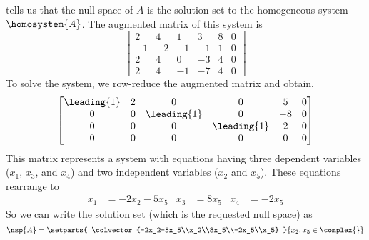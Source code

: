  tells us that the null space of $A$ is the solution set to the homogeneous system $\homosystem{A}$.  The augmented matrix of this system is
%
\begin{equation*}
\begin{bmatrix}
 2 & 4 & 1 & 3 & 8 & 0 \\
 -1 & -2 & -1 & -1 & 1 & 0 \\
 2 & 4 & 0 & -3 & 4 & 0 \\
 2 & 4 & -1 & -7 & 4 & 0 
\end{bmatrix}
\end{equation*}
%
To solve the system, we row-reduce the augmented matrix and obtain,
%
\begin{equation*}
\begin{bmatrix}
 \leading{1} & 2 & 0 & 0 & 5 & 0 \\
 0 & 0 & \leading{1} & 0 & -8 & 0 \\
 0 & 0 & 0 & \leading{1} & 2 & 0 \\
 0 & 0 & 0 & 0 & 0 & 0 
\end{bmatrix}
\end{equation*}
%
This matrix represents a system with equations having three dependent variables ($x_1$, $x_3$,  and $x_4$) and two independent variables ($x_2$ and $x_5$).  These equations rearrange  to
%
\begin{align*}
x_1&=-2x_2-5x_5
&
x_3&=8x_5
&
x_4&=-2x_5
\end{align*}
%
So we can write the solution set (which is the requested null space) as
%
\begin{equation*}
\nsp{A}=\setparts{
\colvector{-2x_2-5x_5\\x_2\\8x_5\\-2x_5\\x_5}
}{
x_2, x_5\in\complex{\null}
}
\end{equation*}